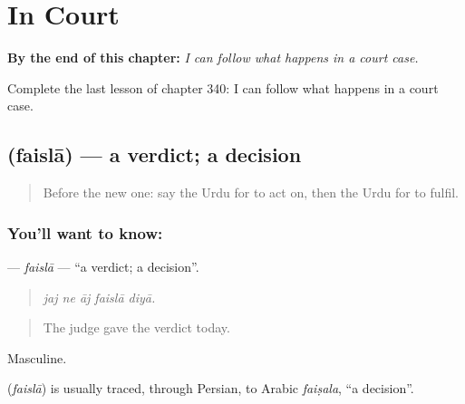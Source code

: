 
\chapter{In Court}
\label{ch:ur-in-court}

\begin{chapteropening}
\textbf{By the end of this chapter:} \emph{I can follow what happens in a court case.}

Complete the last lesson of chapter 340: I can follow what happens in a court case.
\end{chapteropening}

\section[\texorpdfstring{\ur{فیصلہ} (faislā)}{فیصلہ (faislā)}]{ (faislā) — a verdict; a decision}

\label{lesson:UR-C340-faisla}



\begin{quote}
Before the new one: say the Urdu for to act on, then the Urdu for to fulfil.
\end{quote}

\subsection*{You'll want to know: }
\textbf{} — \emph{faislā} — \textquotedblleft{}a verdict; a decision\textquotedblright{}.

\begin{quote}
    
\end{quote}

\begin{quote}
\emph{jaj ne āj faislā diyā.}
\end{quote}

\begin{quote}
The judge gave the verdict today.
\end{quote}

Masculine.

\begin{cousinweb}
\textbf{} (\emph{faislā}) is usually traced, through Persian, to Arabic \emph{faiṣala}, \textquotedblleft{}a decision\textquotedblright{}.
\end{cousinweb}

